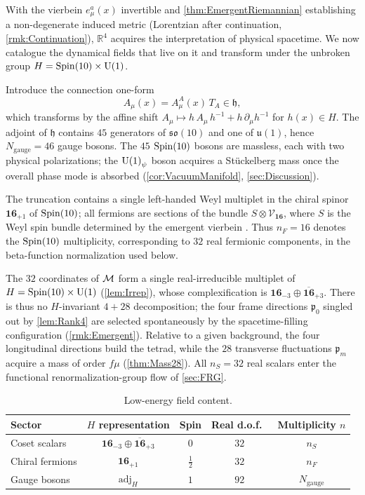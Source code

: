 \documentclass[pdflatex,sn-mathphys-num]{sn-jnl}
\theoremstyle{thmstyleone}
\theoremstyle{thmstylethree}%
\theoremstyle{thmstyletwo}%
\begin{document}
With the vierbein $e_{\mu}^{a}(x)$ invertible and
\autoref{thm:EmergentRiemannian} establishing a non-degenerate induced metric
(Lorentzian after continuation, \autoref{rmk:Continuation}),
$\mathbb R^{4}$ acquires the interpretation of physical spacetime.  We
now catalogue the dynamical fields that live on it and transform under
the unbroken group
\(
  H=\operatorname{Spin}(10) \times \mathrm{U(1)}
\).

Introduce the connection one-form
\begin{equation}\label{eq:GaugeConnection}
  A_{\mu}(x)=A_{\mu}^{A}(x)\,T_{A}\in\mathfrak h,
\end{equation}
which transforms by the affine shift
\(
  A_{\mu}\mapsto h\,A_{\mu}\,h^{-1}+h\,\partial_{\mu}h^{-1}
\)
for $h(x)\in H$.  The adjoint of $\mathfrak h$ contains
$45$ generators of $\mathfrak{so}(10)$ and one of $\mathfrak u(1)$,
hence
\(
  N_{\mathrm{gauge}}=46
\)
gauge bosons. The $45$ $\operatorname{Spin}(10)$ bosons are massless, each with two physical
polarizations; the $\mathrm{U(1)}_\psi$ boson acquires a St\"uckelberg mass once the
overall phase mode is absorbed (\autoref{cor:VacuumManifold},
\autoref{sec:Discussion}).

The truncation contains a single left-handed Weyl multiplet in the chiral
spinor
\(
  \mathbf{16}_{+1}
\)
of $\operatorname{Spin}(10)$; all fermions are sections of the bundle
\(
  S\otimes\mathcal V_{\mathbf{16}}
\),
where $S$ is the Weyl spin bundle determined by the emergent vierbein
\cite{Baez:2010}. Thus $n_{F}=16$ denotes the $\operatorname{Spin}(10)$ multiplicity,
corresponding to $32$ real fermionic components, in the beta-function
normalization used below.

The $32$ coordinates of $\mathcal{M}$ form a single real-irreducible multiplet of
$H=\operatorname{Spin}(10) \times \mathrm{U(1)}$ (\autoref{lem:Irrep}), whose complexification is
\(
  \mathbf{16}_{-3}\oplus\overline{\mathbf{16}}_{+3}.
\)
There is thus no $H$-invariant $4+28$ decomposition; the four frame directions
$\mathfrak p_{0}$ singled out by \autoref{lem:Rank4} are selected
spontaneously by the spacetime-filling configuration
(\autoref{rmk:Emergent}). Relative to a given background, the four longitudinal
directions build the tetrad, while the $28$ transverse fluctuations
$\mathfrak p_{m}$ acquire a mass of order $f\mu$
(\autoref{thm:Mass28}). All
\(
  n_{S}=32
\)
real scalars enter the functional renormalization-group flow of
\autoref{sec:FRG}.

\medskip
\begin{table}[h]
\centering
\caption{Low-energy field content.}
\label{tab:FieldContent}
\renewcommand{\arraystretch}{1.25}
\begin{tabular}{@{}lcccc@{}}
\toprule
Sector & $H$ representation & Spin & Real d.o.f.\ & Multiplicity $n$ \\
\midrule
Coset scalars & $\mathbf{16}_{-3}\oplus\overline{\mathbf{16}}_{+3}$ & $0$ & $32$ & $n_{S}$ \\
Chiral fermions & $\mathbf{16}_{+1}$ & $\tfrac12$ & $32$ & $n_{F}$ \\
Gauge bosons & $\mathrm{adj}_{H}$ & $1$ & $92$ & $N_{\mathrm{gauge}}$ \\
\bottomrule
\end{tabular}
\end{table}
\end{document}
